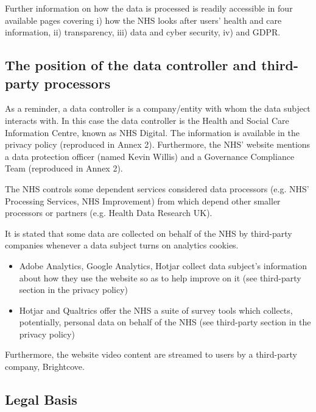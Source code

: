 \documentclass[twocolumn, letterpaper,13pt]{scrartcl}
\begin{document}
        Further information on how the data is processed is readily accessible in four available pages covering i) how the NHS looks after users' health and care information\cite{healthandcare}, ii) transparency\cite{transparency}, iii) data and cyber security\cite{cybersec}, iv) and GDPR\cite{gdprfurther}.
        
        \subsection*{The position of the data controller and third-party processors}
        
        As a reminder, a data controller is a company/entity with whom the data subject interacts with. In this case the data controller is the Health and Social Care Information Centre, known as NHS Digital. The information is available in the privacy policy\cite{privacypolicy} (reproduced in Annex 2). Furthermore, the NHS' website mentions a data protection officer (named Kevin Willis) and a Governance Compliance Team (reproduced in Annex 2).

        The NHS controls some dependent services considered data processors\cite{processors} (e.g. NHS' Processing Services, NHS Improvement) from which depend other smaller processors or partners (e.g. Health Data Research UK).

        It is stated that some data are collected on behalf of the NHS by third-party companies whenever a data subject turns on analytics cookies.

        \begin{itemize}
        \item Adobe Analytics, Google Analytics, Hotjar collect data subject's information about how they use the website so as to help improve on it (see third-party section in the privacy policy\cite{privacypolicy})
        \item Hotjar and Qualtrics offer the NHS a suite of survey tools which collects, potentially, personal data on behalf of the NHS (see third-party section in the privacy policy\cite{privacypolicy})
        \end{itemize}
        
        Furthermore, the website video content are streamed to users by a third-party company, Brightcove.
        
        \subsection*{Legal Basis}
        
\end{document}
